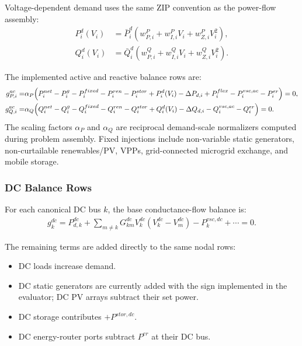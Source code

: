 Voltage-dependent demand uses the same ZIP convention as the power-flow
assembly:
\begin{align}
P_i^d(V_i)&=\bar P_i^d(w_{P,i}^{P}+w_{I,i}^{P}V_i+w_{Z,i}^{P}V_i^2),\\
Q_i^d(V_i)&=\bar Q_i^d(w_{P,i}^{Q}+w_{I,i}^{Q}V_i+w_{Z,i}^{Q}V_i^2).
\end{align}

The implemented active and reactive balance rows are:
\begin{align}
g_{P,i}^{ac}=&
\alpha_P\Bigl(
P_i^{net}
-P_i^g-P_i^{fixed}-P_i^{ren}-P_i^{stor}
+P_i^d(V_i)-\Delta P_{d,i}
+P_i^{flex}
-P_i^{vsc,ac}
-P_i^{er}
\Bigr)=0,\\
g_{Q,i}^{ac}=&
\alpha_Q\Bigl(
Q_i^{net}
-Q_i^g-Q_i^{fixed}-Q_i^{ren}-Q_i^{stor}
+Q_i^d(V_i)-\Delta Q_{d,i}
-Q_i^{vsc,ac}
-Q_i^{er}
\Bigr)=0.
\end{align}
The scaling factors \(\alpha_P\) and \(\alpha_Q\) are reciprocal demand-scale
normalizers computed during problem assembly.  Fixed injections include
non-variable static generators, non-curtailable renewables/PV, VPPs,
grid-connected microgrid exchange, and mobile storage.

\subsubsection{DC Balance Rows}

For each canonical DC bus \(k\), the base conductance-flow balance is:
\begin{align}
g_k^{dc}=
P_{d,k}^{dc}
+\sum_{m\ne k}G_{km}^{dc}V_k^{dc}(V_k^{dc}-V_m^{dc})
-P_k^{vsc,dc}
+\cdots=0 .
\end{align}

The remaining terms are added directly to the same nodal rows:
\begin{itemize}
  \item DC loads increase demand.
  \item DC static generators are currently added with the sign implemented in
  the evaluator; DC PV arrays subtract their set power.
  \item DC storage contributes \(+P^{stor,dc}\).
  \item DC energy-router ports subtract \(P^{er}\) at their DC bus.
\end{itemize}

